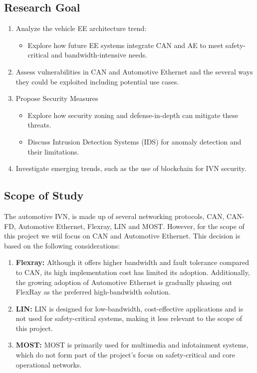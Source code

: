 \documentclass{report}
\begin{document}
\subsection{Research Goal}
\begin{enumerate}
    \item Analyze the vehicle EE architecture trend:
    \begin{itemize}
        \item Explore how future EE systems integrate CAN and AE to meet safety-critical and bandwidth-intensive needs.
    \end{itemize}
    \item Assess vulnerabilities in CAN and Automotive Ethernet and the several ways they could be exploited including potential use cases.
    \item Propose Security Measures
    \begin{itemize}
        \item Explore how security zoning and defense-in-depth can mitigate these threats.
        \item Discuss Intrusion Detection Systems (IDS) for anomaly detection and their limitations.
    \end{itemize}
    \item Investigate emerging trends, such as the use of blockchain for IVN security.
\end{enumerate}


\subsection{Scope of Study}
The automotive IVN, is made up of several networking protocols, CAN, CAN-FD, Automotive Ethernet, Flexray, LIN and MOST. However, for the scope of this project we wiil focus on CAN and Automotive Ethernet. This decision is based on the following considerations:

\begin{enumerate}
    \item \textbf{Flexray:} Although it offers higher bandwidth and fault tolerance compared to CAN, its high implementation cost has limited its adoption. Additionally, the growing adoption of Automotive Ethernet is gradually phasing out FlexRay as the preferred high-bandwidth solution.
    \item \textbf{LIN:} LIN is designed for low-bandwidth, cost-effective applications and is not used for safety-critical systems, making it less relevant to the scope of this project.
    \item \textbf{MOST:} MOST is primarily used for multimedia and infotainment systems, which do not form part of the project's focus on safety-critical and core operational networks.
\end{enumerate}
\end{document}
